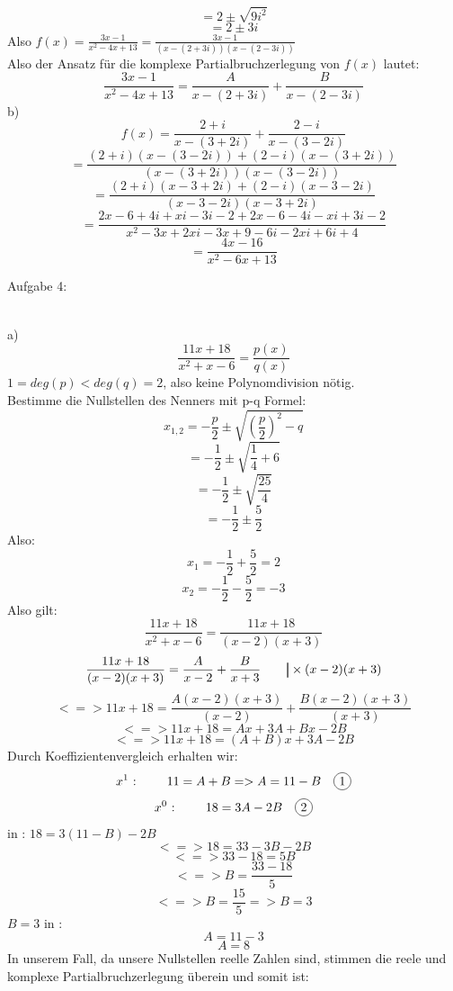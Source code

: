 \documentclass[11pt]{article}
\newcommand\mybar{\kern1pt\rule[-\dp\strutbox]{.8pt}{\baselineskip}\kern1pt}
\newcommand*\circled[1]{\tikz[baseline=(char.base)]{
            \node[shape=circle,draw,inner sep=2pt] (char) {#1};}}
\begin{document}
				$$=2 \pm \sqrt{9i^2}$$
				$$=2\pm 3i$$
				Also $f(x)=\frac{3x-1}{x^2-4x+13}=\frac{3x-1}{(x-(2+3i))(x-(2-3i))}$\\
				Also der Ansatz für die komplexe Partialbruchzerlegung von $f(x)$ lautet:
				$$\frac{3x-1}{x^2-4x+13}=\frac{A}{x-(2+3i)}+\frac{B}{x-(2-3i)}$$
			\indent b)\\
				$$f(x)=\frac{2+i}{x-(3+2i)}+\frac{2-i}{x-(3-2i)}$$
				$$=\frac{(2+i)(x-(3-2i))+(2-i)(x-(3+2i))}{(x-(3+2i))(x-(3-2i))}$$
				$$=\frac{(2+i)(x-3+2i)+(2-i)(x-3-2i)}{(x-3-2i)(x-3+2i)}$$
				$$=\frac{2x-6+4i+xi-3i-2+2x-6-4i-xi+3i-2}{x^2-3x+2xi-3x+9-6i-2xi+6i+4}$$
				$$=\frac{4x-16}{x^2-6x+13}$$
		\noindent \begin{Large}Aufgabe 4:\end{Large}\\[2pt]
			\indent a)\\
				$$\frac{11x+18}{x^2+x-6}=\frac{p(x)}{q(x)}$$
				$1=deg(p)<deg(q)=2$, also keine Polynomdivision nötig.\\
				Bestimme die Nullstellen des Nenners mit p-q Formel:\\
				$$x_{1,2}=-\frac{p}{2}\pm \sqrt{\left(\frac{p}{2}\right)^2-q}$$
				$$=-\frac{1}{2}\pm\sqrt{\frac{1}{4}+6}$$
				$$=-\frac{1}{2}\pm\sqrt{\frac{25}{4}}$$
				$$=-\frac{1}{2}\pm\frac{5}{2}$$
				Also:\\
				$$x_1=-\frac{1}{2}+\frac{5}{2}=2$$
				$$x_2=-\frac{1}{2}-\frac{5}{2}=-3$$
				Also gilt:\\
				$$\frac{11x+18}{x^2+x-6}=\frac{11x+18}{(x-2)(x+3)}$$
				$$\frac{11x+18}{(x-2)(x+3)}=\frac{A}{x-2}+\frac{B}{x+3} \hspace{20pt} \mybar \times (x-2)(x+3)$$
				$$<=>11x+18=\frac{A(x-2)(x+3)}{(x-2)}+\frac{B(x-2)(x+3)}{(x+3)}$$
				$$<=>11x+18=Ax+3A+Bx-2B$$
				$$<=>11x+18=(A+B)x+3A-2B$$
				Durch Koeffizientenvergleich erhalten wir:\\
				$$x^1 \mbox{ : } \hspace{20pt} 11=A+B=>A=11-B \hspace{10pt} \mbox{\circled{1}}$$
				$$x^0 \mbox{ : } \hspace{20pt} 18=3A-2B \hspace{10pt} \mbox{\circled{2}}$$
				\indent \circled{1} in \circled{2}: \hspace{50pt} $18=3(11-B)-2B$
				$$<=>18=33-3B-2B$$
				$$<=>33-18=5B$$
				$$<=>B=\frac{33-18}{5}$$
				$$<=>B=\frac{15}{5}=>B=3$$
				\indent $B=3$ in \circled{1}:\\
				$$A=11-3$$
				$$A=8$$
				In unserem Fall, da unsere Nullstellen reelle Zahlen sind, stimmen die reele und komplexe Partialbruchzerlegung überein und somit ist:\\
\end{document}
